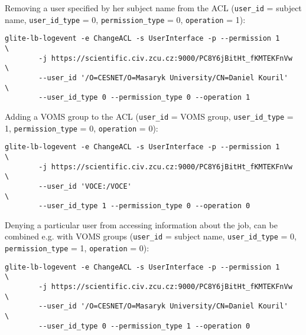Removing a user specified by her subject name from the ACL (\verb'user_id' =
subject name, \verb'user_id_type' = 0, \verb'permission_type' = 0,
\verb'operation' = 1):

\begin{verbatim}
glite-lb-logevent -e ChangeACL -s UserInterface -p --permission 1          \
        -j https://scientific.civ.zcu.cz:9000/PC8Y6jBitHt_fKMTEKFnVw    \
        --user_id '/O=CESNET/O=Masaryk University/CN=Daniel Kouril'     \
        --user_id_type 0 --permission_type 0 --operation 1
\end{verbatim}

Adding a VOMS group to the ACL (\verb'user_id' = VOMS group,
\verb'user_id_type' = 1,  \verb'permission_type' = 0, \verb'operation' = 0):

\begin{verbatim}
glite-lb-logevent -e ChangeACL -s UserInterface -p --permission 1          \
        -j https://scientific.civ.zcu.cz:9000/PC8Y6jBitHt_fKMTEKFnVw    \
        --user_id 'VOCE:/VOCE'                                          \
        --user_id_type 1 --permission_type 0 --operation 0
\end{verbatim}

Denying a particular user from accessing information about the job, can be
combined e.g. with VOMS groups (\verb'user_id' = subject name,
\verb'user_id_type' = 0, \verb'permission_type' = 1, \verb'operation' = 0):

\begin{verbatim}
glite-lb-logevent -e ChangeACL -s UserInterface -p --permission 1          \
        -j https://scientific.civ.zcu.cz:9000/PC8Y6jBitHt_fKMTEKFnVw    \
        --user_id '/O=CESNET/O=Masaryk University/CN=Daniel Kouril'     \
        --user_id_type 0 --permission_type 1 --operation 0
\end{verbatim}

